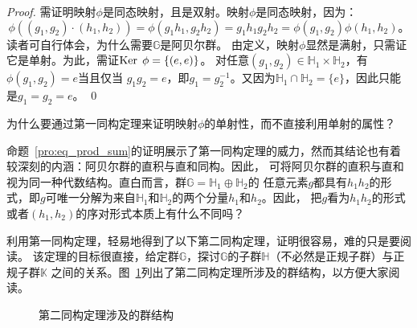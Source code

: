 \begin{proof}
需证明映射$\phi$是同态映射，且是双射。映射$\phi$是同态映射，因为：
\[ \phi((g_1, g_2)\cdot(h_1, h_2)) = \phi(g_1 h_1, g_2h_2) =  g_1h_1g_2h_2 = \phi(g_1,g_2)\phi(h_1, h_2)\text{。}\]
读者可自行体会，为什么需要$\mathbb{G}$是阿贝尔群。
由定义，映射$\phi$显然是满射，只需证它是单射。为此，需证$\operatorname{Ker}\; \phi = \{ (e, e) \}$。
对任意$(g_1, g_2) \in \mathbb{H}_1 \times \mathbb{H}_2$，有$\phi(g_1, g_2) = e $当且仅当
$g_1  g_2 = e$，即$g_1 = g_2^{-1}$。又因为$\mathbb{H}_1 \cap \mathbb{H}_2 = \{ e \}$，因此只能是$g_1 = g_2 = e$。
\qed
\end{proof}

\begin{thinking}
为什么要通过第一同构定理来证明映射$\phi$的单射性，而不直接利用单射的属性？
\end{thinking}
命题~\ref{pro:eq_prod_sum}的证明展示了第一同构定理的威力，然而其结论也有着较深刻的内涵：阿贝尔群的直积与直和同构。因此，
可将阿贝尔群的直积与直和视为同一种代数结构。直白而言，群$\mathbb{G} = \mathbb{H}_1 \oplus \mathbb{H}_2$的
任意元素$g$都具有$ h_1h_2$的形式，即$g$可唯一分解为来自$\mathbb{H}_1$和$\mathbb{H}_2$的两个分量$h_1$和$h_2$。因此，
把$g$看为$h_1h_2$的形式或者$(h_1, h_2)$的序对形式本质上有什么不同吗？

利用第一同构定理，轻易地得到了以下第二同构定理，证明很容易，难的只是要阅读。
该定理的目标很直接，给定群$\mathbb{G}$，探讨$\mathbb{G}$的子群$\mathbb{H}$（不必然是正规子群）与正规子群$\mathbb{K}$
之间的关系。图~\ref{fig:SIT}列出了第二同构定理所涉及的群结构，以方便大家阅读。

\begin{figure}
\begin{center}

\caption{第二同构定理涉及的群结构}
\label{fig:SIT}   
\end{center}
\end{figure}

